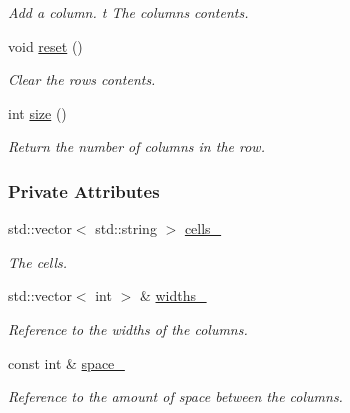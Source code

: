 \begin{DoxyCompactItemize}
\begin{DoxyCompactList}\small\item\em Add a column. t The column\textquotesingle{}s contents. \end{DoxyCompactList}\item 
void \hyperlink{structslb_1_1core_1_1util_1_1Row_a4dd12adac932de87f6aea0f9f3a5fa27}{reset} ()\hypertarget{structslb_1_1core_1_1util_1_1Row_a4dd12adac932de87f6aea0f9f3a5fa27}{}\label{structslb_1_1core_1_1util_1_1Row_a4dd12adac932de87f6aea0f9f3a5fa27}

\begin{DoxyCompactList}\small\item\em Clear the row\textquotesingle{}s contents. \end{DoxyCompactList}\item 
int \hyperlink{structslb_1_1core_1_1util_1_1Row_acb93b92f51e12a87702d379f0c82802f}{size} ()
\begin{DoxyCompactList}\small\item\em Return the number of columns in the row. \end{DoxyCompactList}\end{DoxyCompactItemize}
\subsubsection*{Private Attributes}
\begin{DoxyCompactItemize}
\item 
std\+::vector$<$ std\+::string $>$ \hyperlink{structslb_1_1core_1_1util_1_1Row_a41cee5c9f48efb5a55c7086d1e40cc61}{cells\+\_\+}\hypertarget{structslb_1_1core_1_1util_1_1Row_a41cee5c9f48efb5a55c7086d1e40cc61}{}\label{structslb_1_1core_1_1util_1_1Row_a41cee5c9f48efb5a55c7086d1e40cc61}

\begin{DoxyCompactList}\small\item\em The cells. \end{DoxyCompactList}\item 
std\+::vector$<$ int $>$ \& \hyperlink{structslb_1_1core_1_1util_1_1Row_a90eca7396a74a689fdcc8242d270ebff}{widths\+\_\+}\hypertarget{structslb_1_1core_1_1util_1_1Row_a90eca7396a74a689fdcc8242d270ebff}{}\label{structslb_1_1core_1_1util_1_1Row_a90eca7396a74a689fdcc8242d270ebff}

\begin{DoxyCompactList}\small\item\em Reference to the widths of the columns. \end{DoxyCompactList}\item 
const int \& \hyperlink{structslb_1_1core_1_1util_1_1Row_af6b20ecf1f1b5611b27577bd34ff0a19}{space\+\_\+}\hypertarget{structslb_1_1core_1_1util_1_1Row_af6b20ecf1f1b5611b27577bd34ff0a19}{}\label{structslb_1_1core_1_1util_1_1Row_af6b20ecf1f1b5611b27577bd34ff0a19}

\begin{DoxyCompactList}\small\item\em Reference to the amount of space between the columns. \end{DoxyCompactList}\end{DoxyCompactItemize}
